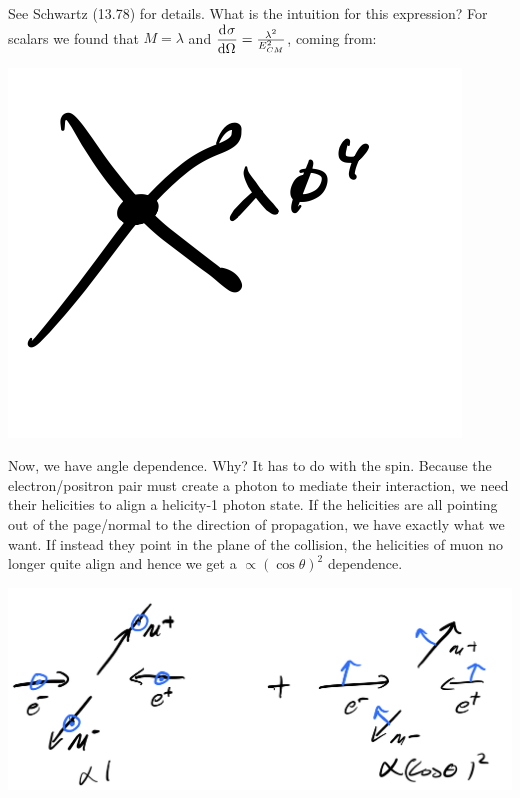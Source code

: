 See Schwartz (13.78) for details. What is the intuition for this expression? For scalars we found that $M = \lambda$ and $\dod{\sigma}{\Omega} = \frac{\lambda^2}{E_{CM}^2}$, coming from:

\begin{center}
    \includegraphics[scale=0.35]{Lectures/Images/lec13-scalarvertex.png}
\end{center}

Now, we have angle dependence. Why? It has to do with the spin. Because the electron/positron pair must create a photon to mediate their interaction, we need their helicities to align a helicity-1 photon state. If the helicities are all pointing out of the page/normal to the direction of propagation, we have exactly what we want. If instead they point in the plane of the collision, the helicities of muon no longer quite align and hence we get a $\propto (\cos\theta)^2$ dependence.

\begin{center}
    \includegraphics[scale=0.35]{Lectures/Images/lec13-twoparts.png}
\end{center}
